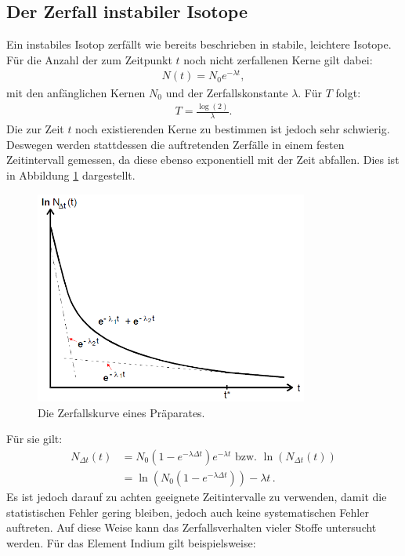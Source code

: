  \subsection{Der Zerfall instabiler Isotope}
 Ein instabiles Isotop zerfällt wie bereits beschrieben in stabile, leichtere Isotope. Für die Anzahl der zum Zeitpunkt $t$ noch nicht 
 zerfallenen Kerne gilt dabei:
 \begin{align}
   N(t) = N_0 e^{-\lambda t},
   \end{align}
mit den anfänglichen Kernen $N_0$ und der Zerfallskonstante $\lambda$.
Für $T$ folgt:
\begin{align}
  T = \frac{\log(2)}{\lambda}\text{.}\label{T}
\end{align}
Die zur Zeit $t$ noch existierenden Kerne zu bestimmen ist jedoch sehr schwierig.
Deswegen werden stattdessen die auftretenden Zerfälle in einem festen Zeitintervall gemessen, da diese ebenso exponentiell mit der Zeit abfallen. Dies ist
in Abbildung \ref{fig:Zerfallskurve} dargestellt.
\begin{figure}[H]
  \centering
  \includegraphics[width = 9cm, height= 7cm]{Zerfallskurve.png}
  \caption{Die Zerfallskurve eines Präparates.\cite{1}}
  \label{fig:Zerfallskurve}
\end{figure}
\noindent
Für sie gilt:
\begin{align}
  N_{\Delta t}(t) &= N_0 \left(1 - e^{-\lambda \Delta t}\right)e^{- \lambda t} \text{  bzw.  } \ln \left( N_{\Delta t}(t) \right) \\
    &= \ln \left( N_0(1- e^{- \lambda \Delta t}) \right) - \lambda t \,.
\end{align}
Es ist jedoch darauf zu achten geeignete Zeitintervalle zu verwenden, damit die statistischen Fehler gering bleiben, jedoch auch keine 
systematischen Fehler auftreten.
Auf diese Weise kann das Zerfallsverhalten vieler Stoffe untersucht werden. Für das Element Indium gilt beispielsweise:
